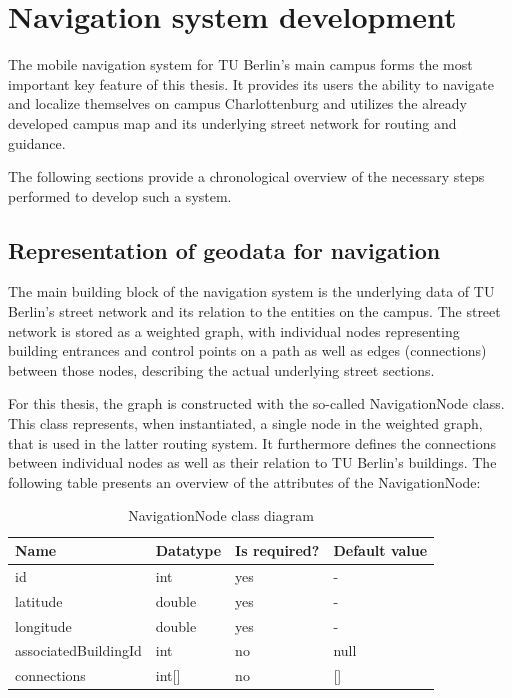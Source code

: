 \section{Navigation system development}
The mobile navigation system for TU Berlin's main campus forms the most important key feature of this thesis. It provides its users the ability to navigate and localize themselves on campus Charlottenburg and utilizes the already developed campus map and its underlying street network for routing and guidance.

The following sections provide a chronological overview of the necessary steps performed to develop such a system.

\subsection{Representation of geodata for navigation}
The main building block of the navigation system is the underlying data of TU Berlin's street network and its relation to the entities on the campus. The street network is stored as a weighted graph, with individual nodes representing building entrances and control points on a path as well as edges (connections) between those nodes, describing the actual underlying street sections.

For this thesis, the graph is constructed with the so-called NavigationNode class. This class represents, when instantiated, a single node in the weighted graph, that is used in the latter routing system. It furthermore defines the connections between individual nodes as well as their relation to TU Berlin's buildings. The following table presents an overview of the attributes of the NavigationNode:

\begin{table}[!ht]
	\small
	\centering
	\begin{tabular}{|l|l|l|l|}
		\hline
		Name                	& Datatype       		& Is required?       			& Default value 	\\
		\hline
        id               		& int	              	& yes                          	& - 				\\
		\hline
        latitude                & double              	& yes                          	& - 				\\
		\hline
		longitude               & double              	& yes                          	& - 				\\
		\hline
		associatedBuildingId    & int              		& no                          	& null 				\\
		\hline
		connections    			& int[]              	& no                          	& [] 				\\
		\hline
	\end{tabular}
	\caption{NavigationNode class diagram}
\end{table}

